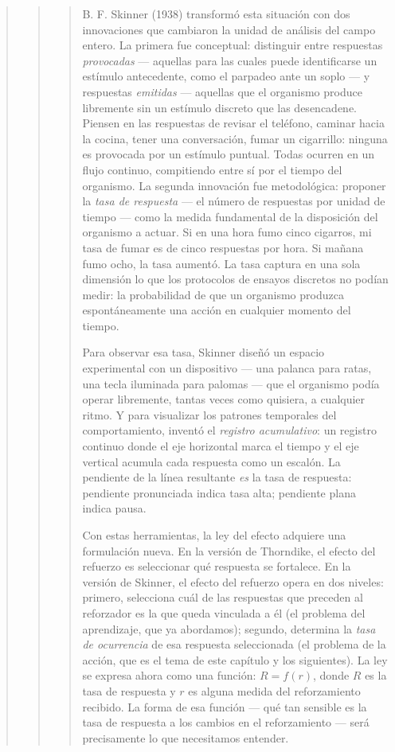 \documentclass[
  letterpaper,
  DIV=11,
  numbers=noendperiod]{scrreprt}
\begin{document}
\begin{tcolorbox}[enhanced jigsaw, toprule=.15mm, arc=.35mm, colback=white, opacityback=0, colframe=quarto-callout-note-color-frame, breakable, rightrule=.15mm, left=2mm, leftrule=.75mm, bottomrule=.15mm]
\begin{quote}
\begin{quote}
\begin{quote}
B. F. Skinner (1938) transformó esta situación con dos innovaciones que
cambiaron la unidad de análisis del campo entero. La primera fue
conceptual: distinguir entre respuestas \emph{provocadas} --- aquellas
para las cuales puede identificarse un estímulo antecedente, como el
parpadeo ante un soplo --- y respuestas \emph{emitidas} --- aquellas que
el organismo produce libremente sin un estímulo discreto que las
desencadene. Piensen en las respuestas de revisar el teléfono, caminar
hacia la cocina, tener una conversación, fumar un cigarrillo: ninguna es
provocada por un estímulo puntual. Todas ocurren en un flujo continuo,
compitiendo entre sí por el tiempo del organismo. La segunda innovación
fue metodológica: proponer la \emph{tasa de respuesta} --- el número de
respuestas por unidad de tiempo --- como la medida fundamental de la
disposición del organismo a actuar. Si en una hora fumo cinco cigarros,
mi tasa de fumar es de cinco respuestas por hora. Si mañana fumo ocho,
la tasa aumentó. La tasa captura en una sola dimensión lo que los
protocolos de ensayos discretos no podían medir: la probabilidad de que
un organismo produzca espontáneamente una acción en cualquier momento
del tiempo.

Para observar esa tasa, Skinner diseñó un espacio experimental con un
dispositivo --- una palanca para ratas, una tecla iluminada para palomas
--- que el organismo podía operar libremente, tantas veces como
quisiera, a cualquier ritmo. Y para visualizar los patrones temporales
del comportamiento, inventó el \emph{registro acumulativo}: un registro
continuo donde el eje horizontal marca el tiempo y el eje vertical
acumula cada respuesta como un escalón. La pendiente de la línea
resultante \emph{es} la tasa de respuesta: pendiente pronunciada indica
tasa alta; pendiente plana indica pausa.

Con estas herramientas, la ley del efecto adquiere una formulación
nueva. En la versión de Thorndike, el efecto del refuerzo es seleccionar
qué respuesta se fortalece. En la versión de Skinner, el efecto del
refuerzo opera en dos niveles: primero, selecciona cuál de las
respuestas que preceden al reforzador es la que queda vinculada a él (el
problema del aprendizaje, que ya abordamos); segundo, determina la
\emph{tasa de ocurrencia} de esa respuesta seleccionada (el problema de
la acción, que es el tema de este capítulo y los siguientes). La ley se
expresa ahora como una función: \(R = f(r)\), donde \(R\) es la tasa de
respuesta y \(r\) es alguna medida del reforzamiento recibido. La forma
de esa función --- qué tan sensible es la tasa de respuesta a los
cambios en el reforzamiento --- será precisamente lo que necesitamos
entender.


\end{quote}
\end{quote}
\end{quote}
\end{tcolorbox}
\end{document}
